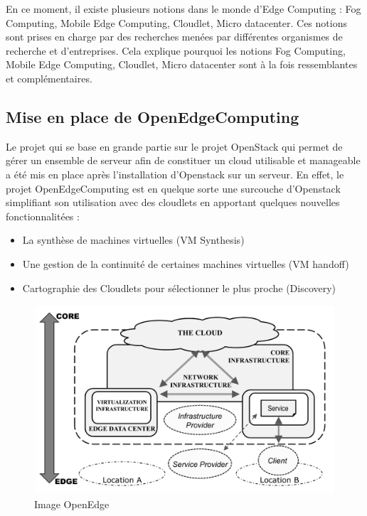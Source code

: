 \documentclass[twocolumn,a4paper]{IEEEtranfr}
\begin{document}
En ce moment, il existe plusieurs notions dans le monde d’Edge Computing : Fog Computing, Mobile Edge Computing, Cloudlet, Micro datacenter. Ces notions sont prises en charge par des recherches menées par différentes organismes de recherche et d’entreprises. Cela explique pourquoi les notions Fog Computing, Mobile Edge Computing, Cloudlet, Micro datacenter sont à la fois ressemblantes et complémentaires.

\subsection{Mise en place de OpenEdgeComputing}

Le projet qui se base en grande partie sur le projet OpenStack qui permet de gérer un ensemble de serveur afin de constituer un cloud utilisable et manageable a été mis en place après l’installation d’Openstack sur un serveur.
En effet, le projet OpenEdgeComputing est en quelque sorte une surcouche d’Openstack simplifiant son utilisation avec des cloudlets en apportant quelques nouvelles fonctionnalitées : 

\begin{itemize}
\item La synthèse de machines virtuelles (VM Synthesis)
\item Une gestion de la continuité de certaines machines virtuelles (VM handoff)
\item Cartographie des Cloudlets pour sélectionner le plus proche (Discovery)
\end{itemize}


\begin{figure}[htpb]
  \begin{center}
    \includegraphics[width=0.8\columnwidth] {../images/open_edge.jpg}
  \end{center}
  \caption{Image OpenEdge  }
  \label{fig:openedge}
\end{figure}
\end{document}
